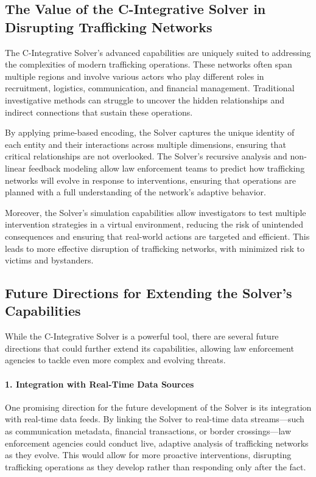 \documentclass[%
 preprint, linenumbers,
 amsmath,amssymb,
 aps, physrev,
]{revtex4-2}
\begin{document}
\subsection{The Value of the C-Integrative Solver in Disrupting Trafficking Networks}

The C-Integrative Solver's advanced capabilities are uniquely suited to addressing the complexities of modern trafficking operations. These networks often span multiple regions and involve various actors who play different roles in recruitment, logistics, communication, and financial management. Traditional investigative methods can struggle to uncover the hidden relationships and indirect connections that sustain these operations.

By applying prime-based encoding, the Solver captures the unique identity of each entity and their interactions across multiple dimensions, ensuring that critical relationships are not overlooked. The Solver's recursive analysis and non-linear feedback modeling allow law enforcement teams to predict how trafficking networks will evolve in response to interventions, ensuring that operations are planned with a full understanding of the network’s adaptive behavior.

Moreover, the Solver's simulation capabilities allow investigators to test multiple intervention strategies in a virtual environment, reducing the risk of unintended consequences and ensuring that real-world actions are targeted and efficient. This leads to more effective disruption of trafficking networks, with minimized risk to victims and bystanders.

\subsection{Future Directions for Extending the Solver's Capabilities}

While the C-Integrative Solver is a powerful tool, there are several future directions that could further extend its capabilities, allowing law enforcement agencies to tackle even more complex and evolving threats.

\paragraph{1. Integration with Real-Time Data Sources}
One promising direction for the future development of the Solver is its integration with real-time data feeds. By linking the Solver to real-time data streams—such as communication metadata, financial transactions, or border crossings—law enforcement agencies could conduct live, adaptive analysis of trafficking networks as they evolve. This would allow for more proactive interventions, disrupting trafficking operations as they develop rather than responding only after the fact.
\end{document}
